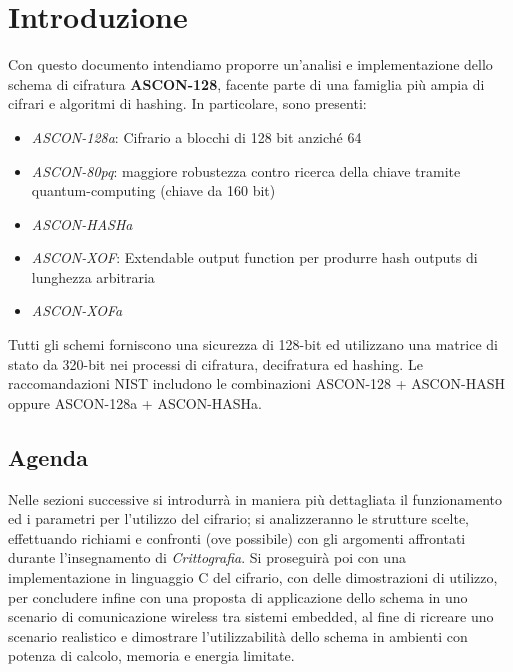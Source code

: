 \section{Introduzione}
Con questo documento intendiamo proporre un'analisi e implementazione dello schema di cifratura \textbf{ASCON-128}, facente parte di una famiglia più ampia di cifrari e algoritmi di hashing. In particolare, sono presenti: 
\begin{itemize}
    \item \textsl{ASCON-128a}: Cifrario a blocchi di 128 bit anziché 64
    \item \textsl{ASCON-80pq}: maggiore robustezza contro ricerca della chiave tramite quantum-computing (chiave da 160 bit)
    \item \textsl{ASCON-HASHa}
    \item \textsl{ASCON-XOF}: Extendable output function per produrre hash outputs di lunghezza arbitraria
    \item \textsl{ASCON-XOFa}
\end{itemize}
Tutti gli schemi forniscono una sicurezza di 128-bit ed utilizzano una matrice di stato da 320-bit nei processi di cifratura, decifratura ed hashing. Le raccomandazioni NIST includono le combinazioni ASCON-128 + ASCON-HASH oppure ASCON-128a + ASCON-HASHa.
\subsection{Agenda}
Nelle sezioni successive si introdurrà in maniera più dettagliata il funzionamento ed i parametri per l'utilizzo del cifrario; si analizzeranno le strutture scelte, effettuando richiami e confronti (ove possibile) con gli argomenti affrontati durante l'insegnamento di \textsl{Crittografia}. Si proseguirà poi con una implementazione in linguaggio C del cifrario, con delle dimostrazioni di utilizzo, per concludere infine con una proposta di applicazione dello schema in uno scenario di comunicazione wireless tra sistemi embedded, al fine di ricreare uno scenario realistico e dimostrare l'utilizzabilità dello schema in ambienti con potenza di calcolo, memoria e energia limitate. 

\newpage